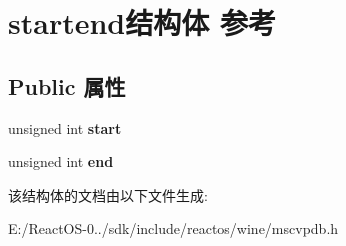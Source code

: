 \hypertarget{structstartend}{}\section{startend结构体 参考}
\label{structstartend}
\subsection*{Public 属性}
\begin{DoxyCompactItemize}
\item 
\mbox{\label{structstartend_a877caef0c05735ab8835457376ecaae8}} 
unsigned int {\bfseries start}
\item 
\mbox{\label{structstartend_a1b05aee40ad80492f769a5d9bf992f9e}} 
unsigned int {\bfseries end}
\end{DoxyCompactItemize}


该结构体的文档由以下文件生成\+:\begin{DoxyCompactItemize}
\item 
E\+:/\+React\+O\+S-\/0../sdk/include/reactos/wine/mscvpdb.\+h\end{DoxyCompactItemize}
